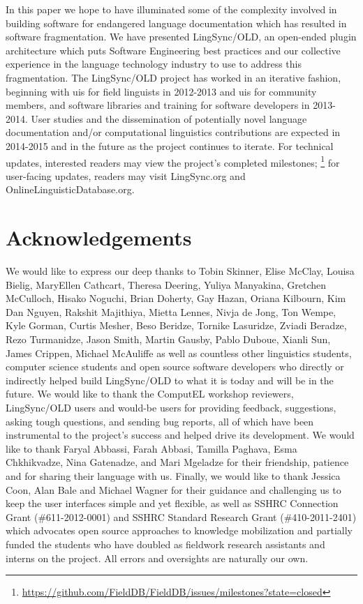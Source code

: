 \documentclass[11pt]{article}
\begin{document}
In this paper we hope to have illuminated some of the complexity involved in
building software for endangered language documentation which has resulted in software
fragmentation. We have presented LingSync/OLD,  an open-ended plugin
architecture which puts Software Engineering best practices and our collective
experience in the language technology industry  to use to address this
fragmentation. The LingSync/OLD project has worked in an iterative fashion,
beginning with \glspl{ui} for field linguists in 2012-2013 and \glspl{ui} for 
community members, and software libraries and training for software
developers in 2013-2014. User studies and the dissemination of potentially
novel language documentation and/or computational linguistics contributions are
expected in 2014-2015 and in the future as the project continues to iterate.
For technical updates, interested readers may view the project's completed
milestones;%
\footnote{\url{https://github.com/FieldDB/FieldDB/issues/milestones?state=closed}} %
for user-facing updates, readers may visit LingSync.org and
OnlineLinguisticDatabase.org.


\section*{Acknowledgements}

We would like to express our deep thanks to Tobin Skinner, Elise McClay, Louisa
Bielig, MaryEllen Cathcart, Theresa Deering, Yuliya Manyakina, Gretchen
McCulloch, Hisako Noguchi, Brian Doherty, Gay Hazan, Oriana Kilbourn, Kim Dan
Nguyen, Rakshit Majithiya, Mietta Lennes, Nivja de Jong, Ton Wempe, Kyle
Gorman, Curtis Mesher, Beso Beridze, Tornike Lasuridze, Zviadi Beradze, Rezo
Turmanidze, Jason Smith, Martin Gausby, Pablo Duboue, Xianli Sun, James Crippen,
Michael McAuliffe as well as countless other linguistics students, computer
science students and open source software developers who directly or indirectly
helped build LingSync/OLD to what it is today and will be in the future. We
would like to thank the ComputEL workshop reviewers, LingSync/OLD users and
would-be users for providing feedback, suggestions, asking tough questions, and
sending bug reports, all of which have been instrumental to the project's
success and helped drive its development. We would like to thank Faryal
Abbassi, Farah Abbasi, Tamilla Paghava, Esma Chkhikvadze, Nina Gatenadze, and
Mari Mgeladze for their friendship, patience and for sharing their language
with us.  Finally, we would like to thank Jessica Coon, Alan Bale and Michael
Wagner for their guidance and challenging us to keep the user interfaces simple
and yet flexible, as well as SSHRC Connection Grant (\#611-2012-0001) and SSHRC
Standard Research Grant (\#410-2011-2401) which advocates open source
approaches to knowledge mobilization and partially funded the students who have
doubled as fieldwork research assistants and interns on the project. All errors
and oversights are naturally our own.




\end{document}
